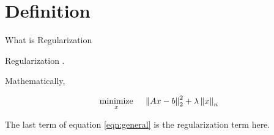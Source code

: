 \section{Definition}

\begin{frame}{What is Regularization} \label{regularization}

    \begin{block}{Regularization}
    .

    Mathematically, 

    \begin{equation}
    \label{eqn:general}
        \underset{x}{\operatorname{minimize}}\; \quad \left\|Ax-b\right\|_2^2+\lambda \left\|x\right\|_n
    \end{equation}

    The last term of equation \ref{eqn:general} is the regularization term here.
    \end{block}
\end{frame}
